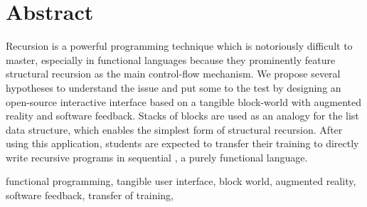 
\section*{Abstract}
Recursion is a powerful programming technique which is notoriously
difficult to master, especially in functional languages because they
prominently feature structural recursion as the main control\hyp{}flow
mechanism. We propose several hypotheses to understand the issue and
put some to the test by designing an open\hyp{}source interactive
interface based on a tangible block\hyp{}world with augmented reality
and software feedback. Stacks of blocks are used as an analogy for the
list data structure, which enables the simplest form of structural
recursion. After using this application, students are expected to
transfer their training to directly write recursive programs in
sequential \erlang, a purely functional language.

\bigskip \bigskip \bigskip

\begin{keywords}
  functional programming, tangible user interface, block world,
  augmented reality, software feedback, transfer of training, \erlang
\end{keywords}


